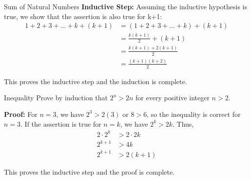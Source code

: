 \documentclass{beamer}
\begin{document}
\begin{frame}{Sum of Natural Numbers}
    \textbf{Inductive Step:}
    Assuming the inductive hypothesis is true, we show that the assertion is also true for k+1:
    \begin{align*}
        1 + 2 + 3 + ... + k + (k+1) &= (1 + 2 + 3 + ... + k) + (k+1) \\
        &= \frac{k(k+1)}{2} + (k+1) \\
        &= \frac{k(k+1)+2(k+1)}{2} \\
        &= \frac{(k+1)(k+2)}{2}
    \end{align*}
    
    This proves the inductive step and the induction is complete.
\end{frame}

\begin{frame}{Inequality}
    Prove by induction that $2^n > 2n$ for every positive integer $n > 2$. \newline
    
    \textbf{Proof:} For $n = 3$, we have $2^3 > 2(3)$ or $8 > 6$, so the inequality is correct for $n = 3$. \newline
    If the assertion is true for $n = k$, we have $2^k > 2k$. \newline
    Thus,
    \begin{align*}
        2 \cdot 2^k &> 2 \cdot 2k \\
        2^{k+1} &> 4k \\
        2^{k+1} &> 2(k+1)
    \end{align*}
    
    This proves the inductive step and the proof is complete.
\end{frame}
\end{document}
